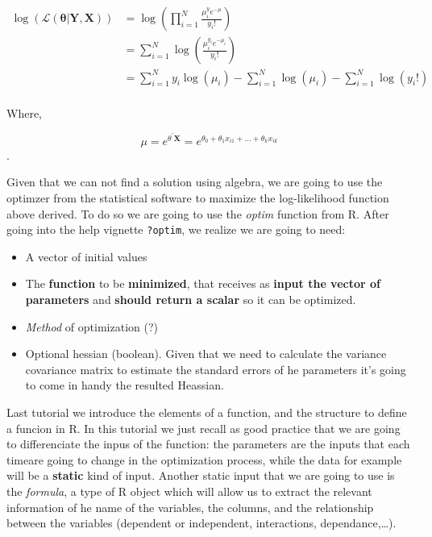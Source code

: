 \documentclass[]{book}
\providecommand{\tightlist}{%
  \setlength{\itemsep}{0pt}\setlength{\parskip}{0pt}}
\begin{document}
\begin{equation}
\begin{aligned}
 \log( \mathcal{L}(\boldsymbol{\theta} | \boldsymbol{Y},\boldsymbol{X}))  &= \log \left( \prod_{i=1}^N \frac{\mu_i^y e^{-\mu}}{y_i!} \right) \\
 &= \sum_{i=1}^N \log \left( \frac{\mu_i^{y_i} e^{-\mu_i}}{y_i!} \right)\\
 &= \sum_{i=1}^N y_i \log \left(\mu_i \right) - \sum_{i=1}^N \log \left(\mu_i\right) -\sum_{i=1}^N \log \left(y_i! \right)\\
\end{aligned}
\end{equation}

Where,

\[ \mu = e^{\theta^{\prime} \boldsymbol{X}}=e^{\theta_0 + \theta_1 x_{i1}+ ... + \theta_k x_{ik} }\].

Given that we can not find a solution using algebra, we are going to use
the optimzer from the statistical software to maximize the
log-likelihood function above derived. To do so we are going to use the
\emph{optim} function from R. After going into the help vignette
\texttt{?optim}, we realize we are going to need:

\begin{itemize}
\tightlist
\item
  A vector of initial values
\item
  The \textbf{function} to be \textbf{minimized}, that receives as
  \textbf{input the vector of parameters} and \textbf{should return a
  scalar} so it can be optimized.
\item
  \emph{Method} of optimization (?)
\item
  Optional hessian (boolean). Given that we need to calculate the
  variance covariance matrix to estimate the standard errors of he
  parameters it's going to come in handy the resulted Heassian.
\end{itemize}

Last tutorial we introduce the elements of a function, and the structure
to define a funcion in R. In this tutorial we just recall as good
practice that we are going to differenciate the inpus of the function:
the parameters are the inputs that each timeare going to change in the
optimization process, while the data for example will be a
\textbf{static} kind of input. Another static input that we are going to
use is the \emph{formula}, a type of R object which will allow us to
extract the relevant information of he name of the variables, the
columns, and the relationship between the variables (dependent or
independent, interactions, dependance,\ldots{}).
\end{document}
